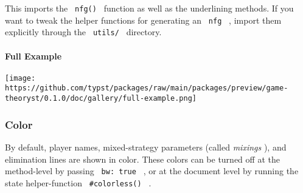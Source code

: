 \begin{Shaded}
\begin{Highlighting}[]
\end{Highlighting}
\end{Shaded}

This imports the \texttt{\ nfg()\ } function as well as the underlining
methods. If you want to tweak the helper functions for generating an
\texttt{\ nfg\ } , import them explicitly through the
\texttt{\ utils/\ } directory.

\paragraph{Full Example}\label{full-example}

\begin{Shaded}
\begin{Highlighting}[]
\NormalTok{  ),}
\NormalTok{  [$0,vul(100000000)$], [$0,1$], [$0,0$],}
\NormalTok{)}
\end{Highlighting}
\end{Shaded}

\texttt{[image: https://github.com/typst/packages/raw/main/packages/preview/game-theoryst/0.1.0/doc/gallery/full-example.png]}

\subsubsection{Color}\label{color}

By default, player names, mixed-strategy parameters (called
\emph{mixings} ), and elimination lines are shown in color. These colors
can be turned off at the method-level by passing \texttt{\ bw:\ true\ }
, or at the document level by running the state helper-function
\texttt{\ \#colorless()\ } .

